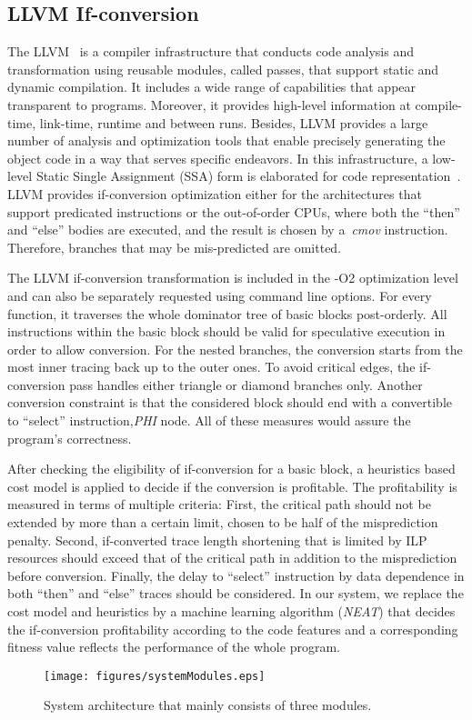 \documentclass[preprint,nocopyrightspace]{sigplanconf}
\begin{document}
\subsection{LLVM If-conversion}
\label{LLVM} 
The LLVM~\cite{llvm} is a compiler infrastructure that conducts code analysis and transformation using reusable modules, called passes, that support static and dynamic compilation. It includes a  wide range of capabilities that appear transparent to programs. Moreover, it provides high-level information at compile-time, link-time, runtime and between runs. Besides, LLVM provides a large number of analysis and optimization tools that enable precisely generating the object code in a way that serves specific endeavors. In this infrastructure, a low-level Static Single Assignment (SSA) form is elaborated for code representation~\cite{lattner2004llvm}.
LLVM provides if-conversion optimization either 
for the architectures that support predicated instructions
or the out-of-order CPUs, where both the ``then'' and ``else'' bodies are executed, and the result is chosen by a~\textit{cmov} instruction. Therefore, branches that may be mis-predicted are omitted. 


The LLVM if-conversion transformation is included in the -O2 optimization level and can also be separately requested using command line options. For every function, it traverses the whole dominator tree of basic blocks post-orderly. All instructions within the basic block should be valid for speculative execution in order to allow conversion. For the nested branches, the conversion starts from the most inner tracing back up to the outer ones. To avoid critical edges, the if-conversion pass handles either triangle or diamond branches only. Another conversion constraint is that the considered block should end with a convertible to ``select'' instruction,\textit{PHI} node. All of these measures would assure the program's correctness.

After checking the eligibility of if-conversion for a basic block, a heuristics based cost model is applied to decide if the conversion is profitable. The profitability is measured in terms of multiple criteria: First, the critical path should not be extended by more than a certain limit, chosen to be half of the misprediction penalty. 
Second, if-converted trace length shortening that is limited by ILP resources should exceed that of the critical path in addition to the misprediction before conversion. Finally, the delay to ``select'' instruction by data dependence in both ``then'' and ``else'' traces should be considered. In our system, we replace the cost model and heuristics by a machine learning algorithm (\textit{NEAT}) that decides the if-conversion profitability according to the code features and a corresponding fitness value reflects the performance of the whole program.
\begin{figure*}[!t]
\centering
\texttt{[image: figures/systemModules.eps]}
\caption{System architecture that mainly consists of three modules.}
\label{fig:systemModules}
\end{figure*}
\end{document}

